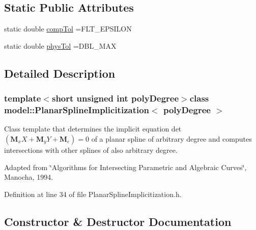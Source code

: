 \subsection*{Static Public Attributes}
\begin{DoxyCompactItemize}
\item 
static double \hyperlink{classmodel_1_1_planar_spline_implicitization_a0bbcc47f5ede12cad09a512e9d77c7a2}{comp\+Tol} =F\+L\+T\+\_\+\+E\+P\+S\+I\+L\+O\+N
\item 
static double \hyperlink{classmodel_1_1_planar_spline_implicitization_afa18c9543f9fad949a91ed04ff1ca4f9}{phys\+Tol} =D\+B\+L\+\_\+\+M\+A\+X
\end{DoxyCompactItemize}


\subsection{Detailed Description}
\subsubsection*{template$<$short unsigned int poly\+Degree$>$class model\+::\+Planar\+Spline\+Implicitization$<$ poly\+Degree $>$}

Class template that determines the implicit equation det $\left(\mathbf{M}_xX+\mathbf{M}_yY+\mathbf{M}_c\right)=0$ of a planar spline of arbitrary degree and computes intersections with other splines of also arbitrary degree. 

Adapted from \char`\"{}\+Algorithms for Intersecting Parametric and Algebraic Curves\char`\"{}, Manocha, 1994. 

Definition at line 34 of file Planar\+Spline\+Implicitization.\+h.



\subsection{Constructor \& Destructor Documentation}
\hypertarget{classmodel_1_1_planar_spline_implicitization_acf18a04263296e4de97047ffa0f7ada3}{}

